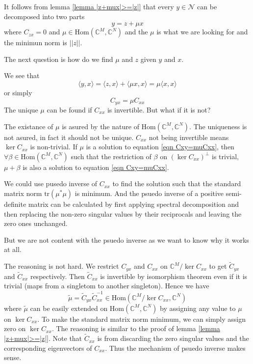 \documentclass[12pt]{article}
\theoremstyle{definition}
\begin{document}
It follows from lemma \ref{lemma |z+mux|>=|z|} that every $y\in\mathcal{N}$ can be decomposed into two parts
$$y=z+\mu x$$
where $C_{zx}=0$ and $\mu\in\mbox{Hom}\left(\mathbb{C}^M, \mathbb{C}^N\right)$ and the $\mu$ is what we are looking for and the minimun norm is $||z||$.

The next question is how do we find $\mu$ and $z$ given $y$ and $x$.

We see that
$$\langle y,x\rangle= \langle z,x\rangle+\langle \mu x,x\rangle=\mu\langle x,x\rangle$$
or simply
\begin{equation}\label{eqn Cxy=muCxx}
	C_{yx}=\mu C_{xx}
\end{equation}
The unique $\mu$ can be found if $C_{xx}$ is invertible. But what if it is not?

The existance of $\mu$ is asured by the nature of $\mbox{Hom}\left(\mathbb{C}^M,\mathbb{C}^N \right)$. The uniqueness is not asured, in fact it should not be unique. $C_{xx}$ not being invertible means $\ker C_{xx}$ is non-trivial. If $\mu$ is a solution to equation \ref{eqn Cxy=muCxx}, then $\forall \beta\in\mbox{Hom}\left(\mathbb{C}^M,\mathbb{C}^N \right)$ such that the restriction of $\beta$ on $\left(\ker C_{xx} \right)^{\perp}$ is trivial, $\mu + \beta$ is also a solution to equation \ref{eqn Cxy=muCxx}.

We could use pusedo inverse of $C_{xx}$ to find the solution such that the standard matrix norm $\mbox{tr}(\mu^*\mu)$ is minimum. And the psuedo inverse of a positive semi-definite matrix can be calculated by first applying spectral decomposition and then replacing the non-zero singular values by their reciprocals and leaving the zero ones unchanged.

But we are not content with the psuedo inverse as we want to know why it works at all.

The reasoning is not hard. We restrict $C_{yx}$ and $C_{xx}$ on $\mathbb{C}^M/\ker C_{xx}$ to get $\tilde{C}_{yx}$ and $\tilde{C}_{xx}$ respectively. Then $\tilde{C}_{xx}$ is invertible by isomorphism theorem even if it is trivial (maps from a singletom to another singleton). Hence we have
$$\tilde{\mu}=\tilde{C}_{yx}\tilde{C}_{xx}^{-1}\in\mbox{Hom}\left(\mathbb{C}^M/\ker C_{xx}, \mathbb{C}^N \right)$$
where $\tilde{\mu}$ can be easily extended on $\mbox{Hom}\left(\mathbb{C}^M,\mathbb{C}^N \right)$ by assigning any value to $\mu$ on $\ker C_{xx}$. To make the standard matrix norm minimum, we can simply assign zero on $\ker C_{xx}$. The reasoning is similar to the proof of lemma \ref{lemma |z+mux|>=|z|}. Note that $\tilde{C}_{xx}$ is from discarding the zero singular values and the corresponding eigenvectors of $C_{xx}$. Thus the mechanism of psuedo inverse makes sense.
\end{document}
